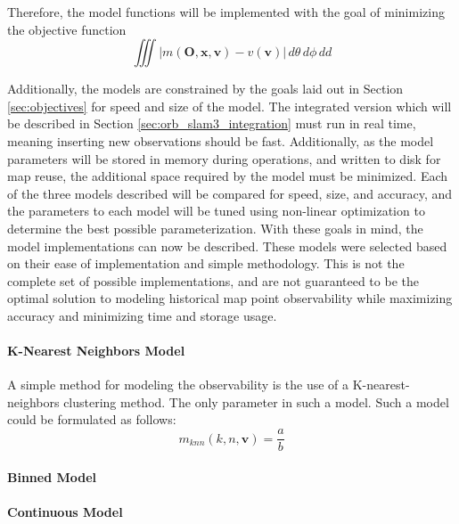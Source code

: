 Therefore, the model functions will be implemented with the goal of minimizing the objective function
$$
    \iiint |m(\boldsymbol{O},\boldsymbol{x},\boldsymbol{v}) - v(\boldsymbol{v})| \,d\theta\,d\phi\,dd
$$

Additionally, the models are constrained by the goals laid out in Section \ref{sec:objectives} for speed and size of the model. The integrated version which will be described in Section \ref{sec:orb_slam3_integration} must run in real time, meaning inserting new observations should be fast. Additionally, as the model parameters will be stored in memory during operations, and written to disk for map reuse, the additional space required by the model must be minimized. Each of the three models described will be compared for speed, size, and accuracy, and the parameters to each model will be tuned using non-linear optimization to determine the best possible parameterization. With these goals in mind, the model implementations can now be described. These models were selected based on their ease of implementation and simple methodology. This is not the complete set of possible implementations, and are not guaranteed to be the optimal solution to modeling historical map point observability while maximizing accuracy and minimizing time and storage usage.

\paragraph{K-Nearest Neighbors Model}
A simple method for modeling the observability is the use of a K-nearest-neighbors clustering method. The only parameter in such a model. Such a model could be formulated as follows:
$$
    m_{knn}(k, n, \boldsymbol{v}) = \frac{a}{b}
$$
\paragraph{Binned Model}
\paragraph{Continuous Model}